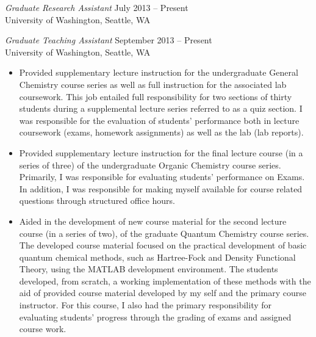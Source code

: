 \documentclass[10pt]{res} %
\begin{document}
\begin{resume}
\vspace{8pt} %

{\sl Graduate Research Assistant} \hfill July 2013 -- Present \\
University of Washington, Seattle, WA

{\sl Graduate Teaching Assistant} \hfill September 2013 -- Present \\
University of Washington, Seattle, WA 
\begin{itemize} \itemsep -2pt
  \item Provided supplementary lecture instruction for the undergraduate General Chemistry course series
    as well as full instruction for the associated lab coursework. This job entailed full responsibility
    for two sections of thirty students during a supplemental lecture series referred to as a quiz section.
    I was responsible for the evaluation of students' performance both in lecture coursework (exams, homework assignments)
    as well as the lab (lab reports).
  \item Provided supplementary lecture instruction for the final lecture course (in a series of three) of
    the undergraduate Organic Chemistry course series. Primarily, I was responsible for evaluating students' performance on
    Exams. In addition, I was responsible for making myself available for course related questions through
    structured office hours.
  \item Aided in the development of new course material for the second lecture course (in a series of two),
    of the graduate Quantum Chemistry course series. The developed course material focused on the practical
    development of basic quantum chemical methods, such as Hartree-Fock and Density Functional Theory, using
    the MATLAB development environment. The students developed, from scratch, a working implementation
    of these methods with the aid of provided course material developed by my self and the primary course
    instructor. For this course, I also had the primary responsibility for evaluating students' progress
    through the grading of exams and assigned course work.
\end{itemize}


\end{resume}
\end{document}
